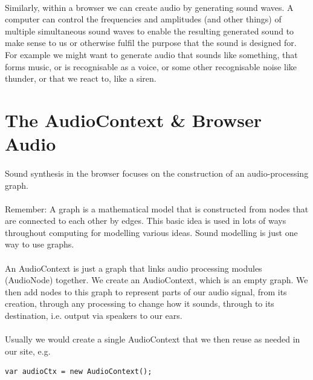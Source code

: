 \paragraph{} Similarly, within a browser we can create audio by generating sound waves. A computer can control the frequencies and amplitudes (and other things) of multiple simultaneous sound waves to enable the resulting generated sound to make sense to us or otherwise fulfil the purpose that the sound is designed for. For example we might want to generate audio that sounds like something, that forms music, or is recognisable as a voice, or some other recognisable noise like thunder, or that we react to, like a siren.

\section{The AudioContext \& Browser Audio}
\paragraph{} Sound synthesis in the browser focuses on the construction of an audio-processing graph.
\paragraph{} Remember: A graph is a mathematical model that is constructed from nodes that are connected to each other by edges. This basic idea is used in lots of ways throughout computing for modelling various ideas. Sound modelling is just one way to use graphs.
\paragraph{} An AudioContext is just a graph that links audio processing modules (AudioNode) together. We create an AudioContext, which is an empty graph. We then add nodes to this graph to represent parts of our audio signal, from its creation, through any processing to change how it sounds, through to its destination, i.e. output via speakers to our ears.
\paragraph{} Usually we would create a single AudioContext that we then reuse as needed in our site, e.g.

\begin{lstlisting}
var audioCtx = new AudioContext();
\end{lstlisting}

